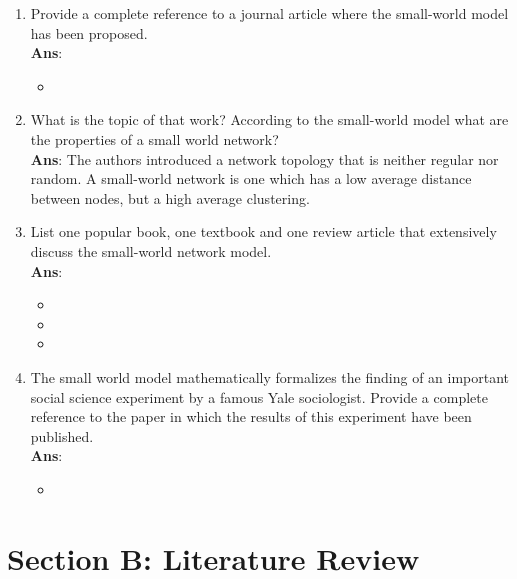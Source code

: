 \documentclass[11pt]{article}
\begin{document}
\begin{enumerate}[label=(\alph*)]
	\item Provide a complete reference to a journal article where the small-world model has been proposed. \\ \textbf{Ans}: \begin{itemize}
		\item {}
	\end{itemize}
	\item What is the topic of that work? According to the small-world model what are the properties of a small world network? \\ \textbf{Ans}: The authors introduced a network topology that is neither regular nor random. A small-world network is one which has a low average distance between nodes, but a high average clustering.
	\item List one popular book, one textbook and one review article that extensively discuss the small-world network model. \\ \textbf{Ans}: \begin{itemize}
		\item {}
		\item {}
		\item {}
	\end{itemize}
	\item The small world model mathematically formalizes the finding of an important social science experiment by a famous Yale sociologist. Provide a complete reference to the paper in which the results of this experiment have been published. \\ \textbf{Ans}: \begin{itemize}
		\item {}
	\end{itemize}
\end{enumerate}
\section*{Section B: Literature Review}
\end{document}
